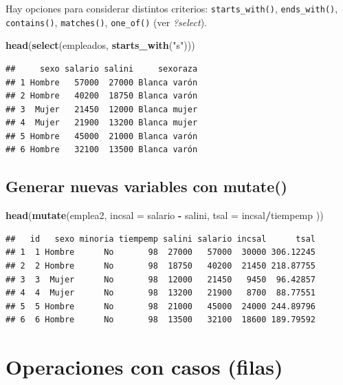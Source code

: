 \documentclass[]{book}
\newenvironment{Shaded}{\begin{snugshade}}{\end{snugshade}}
\newcommand{\DataTypeTok}[1]{\textcolor[rgb]{0.13,0.29,0.53}{#1}}
\newcommand{\KeywordTok}[1]{\textcolor[rgb]{0.13,0.29,0.53}{\textbf{#1}}}
\newcommand{\NormalTok}[1]{#1}
\newcommand{\OperatorTok}[1]{\textcolor[rgb]{0.81,0.36,0.00}{\textbf{#1}}}
\newcommand{\StringTok}[1]{\textcolor[rgb]{0.31,0.60,0.02}{#1}}
\begin{document}
Hay opciones para considerar distintos criterios: \texttt{starts\_with()}, \texttt{ends\_with()},
\texttt{contains()}, \texttt{matches()}, \texttt{one\_of()} (ver \emph{?select}).

\begin{Shaded}
\begin{Highlighting}[]
\KeywordTok{head}\NormalTok{(}\KeywordTok{select}\NormalTok{(empleados, }\KeywordTok{starts_with}\NormalTok{(}\StringTok{"s"}\NormalTok{)))}
\end{Highlighting}
\end{Shaded}

\begin{verbatim}
##     sexo salario salini     sexoraza
## 1 Hombre   57000  27000 Blanca varón
## 2 Hombre   40200  18750 Blanca varón
## 3  Mujer   21450  12000 Blanca mujer
## 4  Mujer   21900  13200 Blanca mujer
## 5 Hombre   45000  21000 Blanca varón
## 6 Hombre   32100  13500 Blanca varón
\end{verbatim}

\hypertarget{generar-nuevas-variables-con-mutate}{%
\subsection{\texorpdfstring{Generar nuevas variables con \textbf{mutate()}}{Generar nuevas variables con mutate()}}\label{generar-nuevas-variables-con-mutate}}

\begin{Shaded}
\begin{Highlighting}[]
\KeywordTok{head}\NormalTok{(}\KeywordTok{mutate}\NormalTok{(emplea2, }\DataTypeTok{incsal =}\NormalTok{ salario }\OperatorTok{-}\StringTok{ }\NormalTok{salini, }\DataTypeTok{tsal =}\NormalTok{ incsal}\OperatorTok{/}\NormalTok{tiempemp ))}
\end{Highlighting}
\end{Shaded}

\begin{verbatim}
##   id   sexo minoria tiempemp salini salario incsal      tsal
## 1  1 Hombre      No       98  27000   57000  30000 306.12245
## 2  2 Hombre      No       98  18750   40200  21450 218.87755
## 3  3  Mujer      No       98  12000   21450   9450  96.42857
## 4  4  Mujer      No       98  13200   21900   8700  88.77551
## 5  5 Hombre      No       98  21000   45000  24000 244.89796
## 6  6 Hombre      No       98  13500   32100  18600 189.79592
\end{verbatim}

\hypertarget{operaciones-con-casos-filas}{%
\section{Operaciones con casos (filas)}\label{operaciones-con-casos-filas}}
\end{document}
